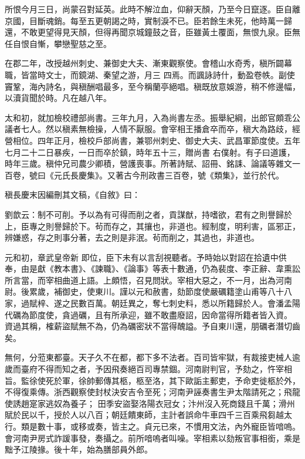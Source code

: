 \begin{pinyinscope}
 所恨今月三日，尚蒙召對延英。此時不解泣血，仰辭天顏，乃至今日竄逐。臣自離京國，目斷魂銷。每至五更朝謁之時，實制淚不已。臣若餘生未死，他時萬一歸還，不敢更望得見天顏，但得再聞京城鐘鼓之音，臣雖黃土覆面，無恨九泉。臣無任自恨自慚，攀戀聖慈之至。



 在郡二年，改授越州刺史、兼御史大夫、漸東觀察使。會稽山水奇秀，稹所闢幕職，皆當時文士，而鏡湖、秦望之游，月三
 四焉。而諷詠詩什，動盈卷帙。副使竇鞏，海內詩名，與稹酬唱最多，至今稱蘭亭絕唱。稹既放意娛游，稍不修邊幅，以瀆貨聞於時。凡在越八年。



 太和初，就加檢校禮部尚書。三年九月，入為尚書左丞。振舉紀綱，出郎官頗乖公議者七人。然以稹素無檢操，人情不厭服。會宰相王播倉卒而卒，稹大為路歧，經營相位。四年正月，檢校戶部尚書，兼鄂州刺史、御史大夫、武昌軍節度使。五年七月二十二日暴疾，一日而卒於鎮，時年五十三，贈尚書
 右僕射。有子曰道護，時年三歲。稹仲兄司農少卿積，營護喪事。所著詩賦、詔冊、銘誄、論議等雜文一百卷，號曰《元氏長慶集》。又著古今刑政書三百卷，號《類集》，並行於代。



 稹長慶末因編刪其文稿，《自敘》曰：



 劉歆云：制不可削。予以為有可得而削之者，貢謀猷，持嗜欲，君有之則譽歸於上，臣專之則譽歸於下。茍而存之，其攘也，非道也。經制度，明利害，區邪正，辨嫌惑，存之則事分著，去之則是非泯。茍而削之，其過也，非道也。



 元和初，章武皇帝新
 即位，臣下未有以言刮視聽者。予時始以對詔在拾遺中供奉，由是獻《教本書》、《諫職》、《論事》等表十數通，仍為裴度、李正辭、韋熏訟所言當，而宰相曲道上語。上頗悟，召見問狀。宰相大惡之，不一月，出為河南尉。後累歲，補御史，使東川。謹以元和赦書，劾節度使嚴礪籍塗山甫等八十八家，過賦梓、遂之民數百萬。朝廷異之，奪七刺史料，悉以所籍歸於人。會潘孟陽代礪為節度使，貪過礪，且有所承迎，雖不敢盡廢詔，因命當得所籍者皆入資。
 資過其稱，榷薪盜賦無不為，仍為礪密狀不當得醜謚。予自東川還，朋礪者潛切齒矣。



 無何，分蒞東都臺。天子久不在都，都下多不法者。百司皆牢獄，有裁接吏械人逾歲而臺府不得而知之者，予因飛奏絕百司專禁錮。河南尉判官，予劾之，忤宰相旨。監徐使死於軍，徐帥郵傳其柩，柩至洛，其下歐詬主郵吏，予命吏徙柩於外，不得復乘傳。浙西觀察使封杖決安吉令至死；河南尹誣奏書生尹太階請死之；飛龍使誘趙寔家逃奴為養子；
 田季安盜娶洛陽衣冠女；汴州沒入死商錢且千萬；滑州賦於民以千，授於人以八百；朝廷饋東師，主計者誤命牛車四千三百乘飛芻越太行。類是數十事，或移或奏，皆主之。貞元已來，不慣用文法，內外寵臣皆喑嗚。會河南尹房式詐諼事發，奏攝之。前所喑嗚者叫噪。宰相素以劾叛官事相銜，乘是黜予江陵掾。後十年，始為膳部員外郎。




\end{pinyinscope}
